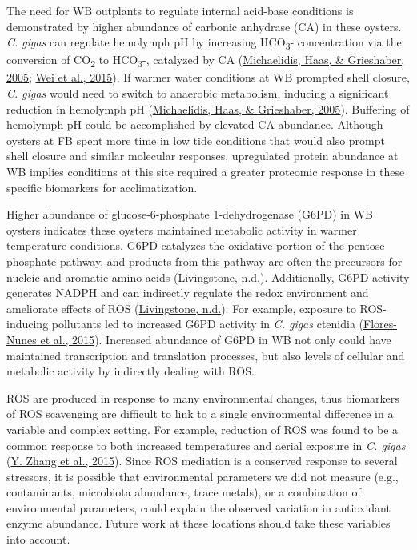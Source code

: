 \documentclass [11pt, proquest] {uwthesis}[2015/03/03]
\begin{document}
The need for WB outplants to regulate internal acid-base conditions is demonstrated by higher abundance of carbonic anhydrase (CA) in these oysters. \emph{C. gigas} can regulate hemolymph pH by increasing HCO\textsubscript{3}- concentration via the conversion of CO\textsubscript{2} to HCO\textsubscript{3}-, catalyzed by CA (\protect\hyperlink{ref-Michaelidis2005}{Michaelidis, Haas, \& Grieshaber, 2005}; \protect\hyperlink{ref-Wei2015}{Wei et al., 2015}). If warmer water conditions at WB prompted shell closure, \emph{C. gigas} would need to switch to anaerobic metabolism, inducing a significant reduction in hemolymph pH (\protect\hyperlink{ref-Michaelidis2005}{Michaelidis, Haas, \& Grieshaber, 2005}). Buffering of hemolymph pH could be accomplished by elevated CA abundance. Although oysters at FB spent more time in low tide conditions that would also prompt shell closure and similar molecular responses, upregulated protein abundance at WB implies conditions at this site required a greater proteomic response in these specific biomarkers for acclimatization.

Higher abundance of glucose-6-phosphate 1-dehydrogenase (G6PD) in WB oysters indicates these oysters maintained metabolic activity in warmer temperature conditions. G6PD catalyzes the oxidative portion of the pentose phosphate pathway, and products from this pathway are often the precursors for nucleic and aromatic amino acids (\protect\hyperlink{ref-Livingstone1981}{Livingstone, n.d.}). Additionally, G6PD activity generates NADPH and can indirectly regulate the redox environment and ameliorate effects of ROS (\protect\hyperlink{ref-Livingstone1981}{Livingstone, n.d.}). For example, exposure to ROS-inducing pollutants led to increased G6PD activity in \emph{C. gigas} ctenidia (\protect\hyperlink{ref-Flores-Nunes2015}{Flores-Nunes et al., 2015}). Increased abundance of G6PD in WB not only could have maintained transcription and translation processes, but also levels of cellular and metabolic activity by indirectly dealing with ROS.

ROS are produced in response to many environmental changes, thus biomarkers of ROS scavenging are difficult to link to a single environmental difference in a variable and complex setting. For example, reduction of ROS was found to be a common response to both increased temperatures and aerial exposure in \emph{C. gigas} (\protect\hyperlink{ref-Zhang2015}{Y. Zhang et al., 2015}). Since ROS mediation is a conserved response to several stressors, it is possible that environmental parameters we did not measure (e.g., contaminants, microbiota abundance, trace metals), or a combination of environmental parameters, could explain the observed variation in antioxidant enzyme abundance. Future work at these locations should take these variables into account.
\end{document}
